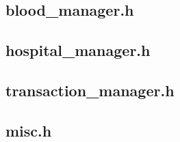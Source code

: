 \documentclass[12pt,a4paper]{report}
\begin{document}
\subsection{blood\_manager.h}


\subsection{hospital\_manager.h}


\subsection{transaction\_manager.h}


\subsection{misc.h}

\end{document}
